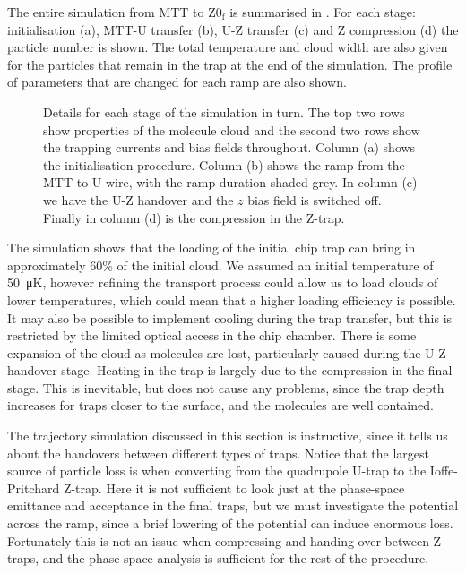 The entire simulation from MTT to $\mathrm{Z0_f}$ is summarised in
. For each stage: initialisation (a), MTT-U
transfer (b), U-Z transfer (c) and Z compression (d) the particle number is
shown. The total temperature and cloud width are also given for the particles
that remain in the trap at the end of the simulation. The profile of parameters
that are changed for each ramp are also shown. 


\begin{figure}[p]
\centering
  \caption[Summary of loading simulations]{
    Details for each stage of the simulation in turn. The top two rows show
    properties of the molecule cloud and the second two rows show the trapping
    currents and bias fields throughout. Column (a) shows the initialisation
    procedure. Column (b) shows the ramp from the MTT to U-wire, with the ramp
    duration shaded grey.  In column (c) we have the U-Z handover and the $z$
    bias field is switched off. Finally in column (d) is the compression in the
    Z-trap.
  }
  \label{sim:fig:simsum}
\end{figure}

The simulation shows that the loading of the initial chip trap can bring in
approximately 60\% of the initial cloud. We assumed an initial temperature of
\SI{50}{\micro\kelvin}, however refining the transport process could allow us
to load clouds of lower temperatures, which could mean that a higher loading
efficiency is possible. It may also be possible to implement cooling during the
trap transfer, but this is restricted by the limited optical access in the chip
chamber.
%
There is some expansion of the cloud as molecules are lost, particularly caused
during the U-Z handover stage.
%
Heating in the trap is largely due to the compression in the final stage. This
is inevitable, but does not cause any problems, since the trap depth
increases for traps closer to the surface, and the molecules are
well contained.

The trajectory simulation discussed in this section is instructive, since it
tells us about the handovers between different types of traps. Notice
that the largest source of particle loss is when converting from the quadrupole
U-trap to the Ioffe-Pritchard Z-trap. Here it is not sufficient to look just at
the phase-space emittance and acceptance in the final traps, but we must
investigate the potential across the ramp, since a brief lowering of the
potential can induce enormous loss. Fortunately this is not an issue when
compressing and handing over between Z-traps, and the phase-space analysis is
sufficient for the rest of the procedure.

